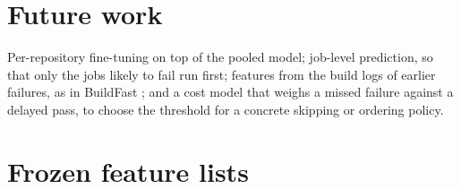 \documentclass[11pt,a4paper]{article}
\newcommand{\tab}[1]{\resizebox{\ifdim\width>\linewidth\linewidth\else\width\fi}{!}{}}
\begin{document}
\section{Future work}

Per-repository fine-tuning on top of the pooled model; job-level prediction, so
that only the jobs likely to fail run first; features from the build logs of
earlier failures, as in BuildFast \cite{chen2020buildfast}; and a cost model that
weighs a missed failure against a delayed pass, to choose the threshold for a
concrete skipping or ordering policy.

\printbibliography

\appendix
\section{Frozen feature lists}
\begin{table}[H]
\centering\small
\tab{features}
\caption{Frozen feature lists, in relevance order.}
\label{tab:features}
\end{table}
\end{document}
